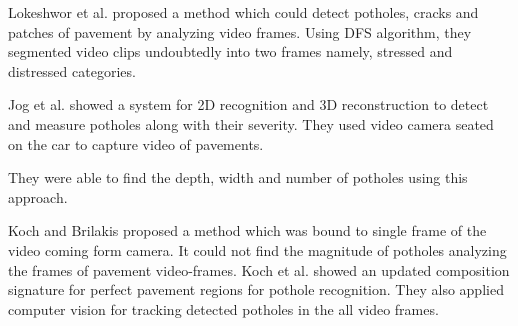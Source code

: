 \documentclass[conference]{IEEEtran}
\begin{document}
Lokeshwor et al.\cite{huidrom2013method} proposed a method which could detect potholes, cracks and patches of pavement by analyzing video frames. Using DFS algorithm\cite{huidrom2013method,kim14}, they segmented video clips undoubtedly into two frames namely, stressed and distressed categories.
    
Jog et al.\cite{jog2012pothole} showed a system for 2D recognition and 3D reconstruction\cite{jog2012pothole} to detect and measure potholes along with their severity. They used video camera seated on the car to capture video of pavements.
    
They were able to find the depth, width and number of potholes using this approach.
    
Koch and Brilakis\cite{koch2013pothole} proposed a method which was bound to single frame of the video coming form camera. It could not find the magnitude of potholes analyzing the frames of pavement video-frames\cite{kim14}.
Koch et al. showed an updated composition signature for perfect pavement regions for pothole recognition. They also applied computer vision for tracking detected potholes in the all video frames\cite{koch2013pothole}.
 
\end{document}
